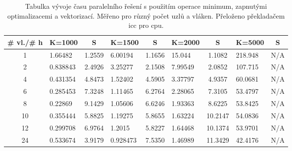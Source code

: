 \documentclass[a4paper,11pt]{article}
\begin{document}
     \begin{table}[ht]
  \begin{center}
   \begin{tabular}{|c|l|c|l|c|l|c|l|c|}
    \hline 
    \# vl./\# h & K=1000 & S & K=1500 & S & K=2000 & S & K=5000 & S \\
   \hline 
   \hline 
   1 & 1.66482 & 1.2559 & 6.00194 & 1.1656 & 15.044 & 1.1082 & 218.948 & N/A\\
   \hline
    2 & 0.838843 & 2.4926 & 3.25277 & 2.1508 & 7.99549 & 2.0852 & 107.715 & N/A\\
   \hline
    4 & 0.431354 & 4.8473 & 1.52402 & 4.5905 & 3.37797 & 4.9357 & 60.0681 & N/A\\
   \hline
    6 & 0.285453 & 7.3248 & 1.11465 & 6.2764 & 2.28065 & 7.3105 & 53.4797 & N/A\\
   \hline
    8 & 0.22869 & 9.1429 & 1.05606 & 6.6246 & 1.93363 & 8.6225 & 53.8425 & N/A\\
      \hline
    10 & 0.355444 & 5.8825 & 1.19275 & 5.8655 & 1.63224 & 10.2147 & 54.0836 & N/A\\ 
      \hline
    12 & 0.299708 & 6.9764 & 1.2015 & 5.8227 & 1.64468 & 10.1374 & 53.9701 & N/A\\
      \hline
    24 & 0.533674 & 3.9179 & 0.928473 & 7.5350 & 1.46989 & 11.3429 & 42.4176 & N/A \\
   \hline    
    \end{tabular}
   \caption{Tabulka vývoje času paralelního řešení s použitím operace minimum, zapnutými optimalizacemi a vektorizací. Měřeno pro různý počet uzlů a vláken. Přeloženo 
   překladačem icc pro cpu.} 
   \label{tab.tab35}
  \end{center}   
  \end{table}
  
\end{document}
